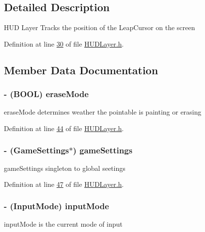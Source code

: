 \subsection{Detailed Description}
H\-U\-D Layer Tracks the position of the Leap\-Cursor on the screen 

Definition at line \hyperlink{_h_u_d_layer_8h_source_l00030}{30} of file \hyperlink{_h_u_d_layer_8h_source}{H\-U\-D\-Layer.\-h}.



\subsection{Member Data Documentation}
\hypertarget{interface_h_u_d_layer_aa1df984387a5f884acf38a7d733d6432}{
\subsubsection[{erase\-Mode}]{\setlength{\rightskip}{0pt plus 5cm}-\/ (B\-O\-O\-L) erase\-Mode\hspace{0.3cm}{\ttfamily [protected]}}}\label{d3/d8a/interface_h_u_d_layer_aa1df984387a5f884acf38a7d733d6432}
erase\-Mode determines weather the pointable is painting or erasing 

Definition at line \hyperlink{_h_u_d_layer_8h_source_l00044}{44} of file \hyperlink{_h_u_d_layer_8h_source}{H\-U\-D\-Layer.\-h}.

\hypertarget{interface_h_u_d_layer_a69515b3bf7bddc07e65bad3eaa4a2e7a}{
\subsubsection[{game\-Settings}]{\setlength{\rightskip}{0pt plus 5cm}-\/ ({\bf Game\-Settings}$\ast$) game\-Settings\hspace{0.3cm}{\ttfamily [protected]}}}\label{d3/d8a/interface_h_u_d_layer_a69515b3bf7bddc07e65bad3eaa4a2e7a}
game\-Settings singleton to global seetings 

Definition at line \hyperlink{_h_u_d_layer_8h_source_l00047}{47} of file \hyperlink{_h_u_d_layer_8h_source}{H\-U\-D\-Layer.\-h}.

\hypertarget{interface_h_u_d_layer_a1e506792d581032644d75804beb359a7}{
\subsubsection[{input\-Mode}]{\setlength{\rightskip}{0pt plus 5cm}-\/ (Input\-Mode) input\-Mode\hspace{0.3cm}{\ttfamily [protected]}}}\label{d3/d8a/interface_h_u_d_layer_a1e506792d581032644d75804beb359a7}
input\-Mode is the current mode of input 

